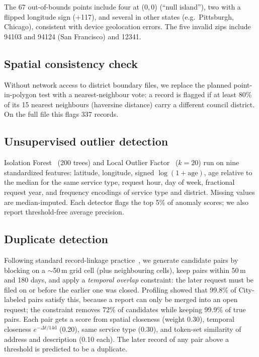 \documentclass[11pt]{article}
\begin{document}
The 67 out-of-bounds points include four at (0,\,0) (``null island''), two with a flipped longitude sign (+117), and several in other states (e.g.\ Pittsburgh, Chicago), consistent with device geolocation errors. The five invalid zips include 94103 and 94124 (San Francisco) and 12341.

\subsection{Spatial consistency check}

Without network access to district boundary files, we replace the planned point-in-polygon test with a nearest-neighbour vote: a record is flagged if at least 80\% of its 15 nearest neighbours (haversine distance) carry a different council district. On the full file this flags 337 records.

\subsection{Unsupervised outlier detection}

Isolation Forest~\cite{liu2008iforest} (200 trees) and Local Outlier Factor~\cite{breunig2000lof} ($k=20$) run on nine standardized features: latitude, longitude, signed $\log(1+\text{age})$, age relative to the median for the same service type, request hour, day of week, fractional request year, and frequency encodings of service type and district. Missing values are median-imputed. Each detector flags the top 5\% of anomaly scores; we also report threshold-free average precision.

\subsection{Duplicate detection}

Following standard record-linkage practice~\cite{elmagarmid2007duplicate}, we generate candidate pairs by blocking on a $\sim$50\,m grid cell (plus neighbouring cells), keep pairs within 50\,m and 180 days, and apply a \emph{temporal overlap} constraint: the later request must be filed on or before the earlier one was closed. Profiling showed that 99.8\% of City-labeled pairs satisfy this, because a report can only be merged into an open request; the constraint removes 72\% of candidates while keeping 99.9\% of true pairs. Each pair gets a score from spatial closeness (weight 0.30), temporal closeness $e^{-\Delta t/14\text{d}}$ (0.20), same service type (0.30), and token-set similarity of address and description (0.10 each). The later record of any pair above a threshold is predicted to be a duplicate.
\end{document}
